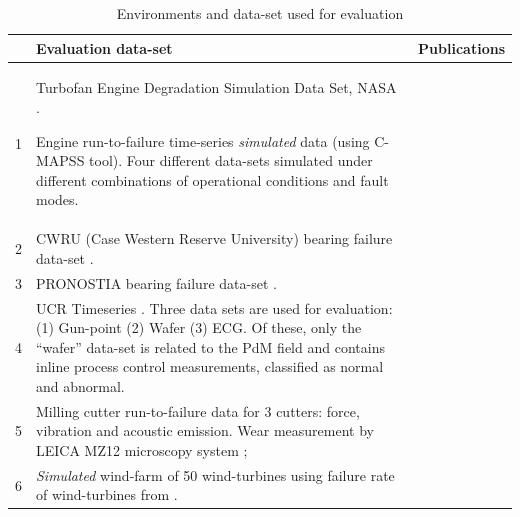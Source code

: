 \documentclass[12pt,oneside]{book}
\renewcommand{\arraystretch}{1.5}
\begin{document}
\begin{table}[h]
\renewcommand\arraystretch{1.5}
\begin{center}
	\begin{minipage}{\textwidth}
		\caption{Environments and data-set used for evaluation}\label{tab:data-set}
		\begin{tabular}{@{} R{0.5cm} L{8cm} L{4cm}@{}}
			\toprule
			&\textbf{Evaluation data-set}&\textbf{Publications}\\
			&Turbofan Engine Degradation Simulation Data Set, NASA \citep{NASATurbofan}.\par Engine run-to-failure time-series \textit{simulated} data (using C-MAPSS tool). Four different data-sets simulated under different combinations of operational conditions and fault modes. & \cite{Skordilis2020, Ong2021, HoongOng2020, Zhang2019488}\\
			2&CWRU (Case Western Reserve University) bearing failure data-set \citep{CWRUBearingDataset}.&\cite{Ding2019, Eltotongy2021117}\\
			3&PRONOSTIA bearing failure data-set \citep{Pronostia2012}.&\cite{Cheng2018}\\
			4&UCR Timeseries \citep{UCRArchive2018}. Three data sets are used for evaluation: (1) Gun-point (2) Wafer (3) ECG. Of these, only the ``wafer'' data-set is related to the PdM field and contains inline process control measurements, classified as normal and abnormal.&\cite{Martinez20182030}\\
			5&Milling cutter run-to-failure data for 3 cutters: force, vibration and acoustic emission. Wear measurement by LEICA MZ12 microscopy system \citep{PHM2010MillingCutterDataset};&\cite{Dai2021}\\
			6&\textit{Simulated} wind-farm of 50 wind-turbines using failure rate of wind-turbines from \citep{ozturk2018}.& \cite{Pinciroli2021}\\
			\bottomrule
		\end{tabular}
	\end{minipage}
\end{center}
\end{table}
\end{document}
